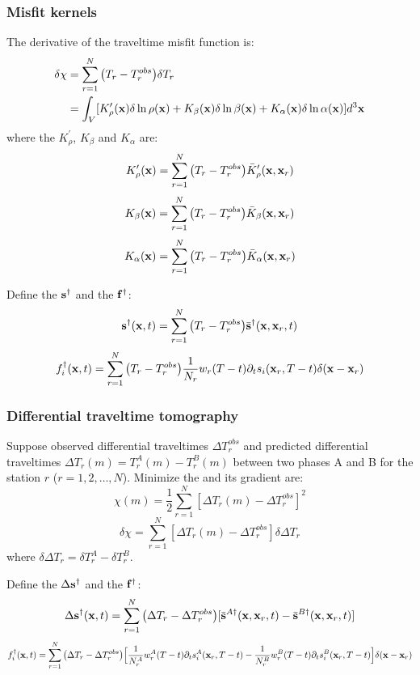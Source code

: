 \subsubsection{Misfit kernels}
The \Frechet derivative of the traveltime misfit function is:
\begin{align*}
  \delta\chi & =\sum_{r=1}^N\big(T_r-T_r^{obs}\big)\delta T_r \\
    & =\int_V[K_\rho^\prime(\mathbf{x})\delta\ln\rho(\mathbf{x})+K_\beta(\mathbf{x})\delta\ln\beta(\mathbf{x})+K_\alpha(\mathbf{x})\delta\ln\alpha(\mathbf{x})]d^3\mathbf{x}
\end{align*}
where the 
$K_\rho^\prime$, $K_\beta$ and $K_\alpha$ are:
\[ K_\rho^\prime(\mathbf{x})=\sum_{r=1}^N\big(T_r-T_r^{obs}\big)\bar K_\rho^\prime(\mathbf{x},\mathbf{x}_r) \]
\[ K_\beta(\mathbf{x})=\sum_{r=1}^N\big(T_r-T_r^{obs}\big)\bar K_\beta(\mathbf{x},\mathbf{x}_r) \]
\[ K_\alpha(\mathbf{x})=\sum_{r=1}^N\big(T_r-T_r^{obs}\big)\bar K_\alpha(\mathbf{x},\mathbf{x}_r) \]

Define the  $\mathbf{s}^\dagger$
and the  $\mathbf{f}^\dagger$:
\[ \mathbf{s}^\dagger(\mathbf{x},t)=\sum_{r=1}^N\big(T_r-T_r^{obs}\big)\bar{\mathbf{s}}^\dagger(\mathbf{x},\mathbf{x}_r,t) \]
\[ f_i^\dagger(\mathbf{x},t)=\sum_{r=1}^N\big(T_r-T_r^{obs}\big)\frac{1}{N_r}w_r(T-t)\partial_ts_i(\mathbf{x}_r,T-t)\delta(\mathbf{x}-\mathbf{x}_r) \]

\subsubsection{Differential traveltime tomography}
Suppose observed differential traveltimes $\Delta T_r^{obs}$
and predicted differential traveltimes $\Delta T_r(m)=T_r^A(m)-T_r^B(m)$
between two phases A and B for the station $r$ ($r=1,2,\ldots,N$).
Minimize the  and its gradient are:
\[ \chi(m)=\frac{1}{2}\sum_{r=1}^N[\Delta T_r(m)-\Delta T_r^{obs}]^2 \]
\[ \delta\chi=\sum_{r=1}^N[\Delta T_r(m)-\Delta T_r^{obs}]\delta\Delta T_r \]
where $\delta\Delta T_r=\delta T_r^A-\delta T_r^B$.

Define the  $\Delta\mathbf{s}^\dagger$
and the  $\mathbf{f}^\dagger$:
\[ \Delta\mathbf{s}^\dagger(\mathbf{x},t)=\sum_{r=1}^N\big(\Delta T_r-\Delta T_r^{obs}\big)[\bar{\mathbf{s}}^{A\dagger}(\mathbf{x},\mathbf{x}_r,t)-\bar{\mathbf{s}}^{B\dagger}(\mathbf{x},\mathbf{x}_r,t)] \]
\[ f_i^\dagger(\mathbf{x},t)=\sum_{r=1}^N\big(\Delta T_r-\Delta T_r^{obs}\big)\Big[\frac{1}{N_r^A}w_r^A(T-t)\partial_ts_i^A(\mathbf{x}_r,T-t)-\frac{1}{N_r^B}w_r^B(T-t)\partial_ts_i^B(\mathbf{x}_r,T-t)\Big]\delta(\mathbf{x}-\mathbf{x}_r) \]

